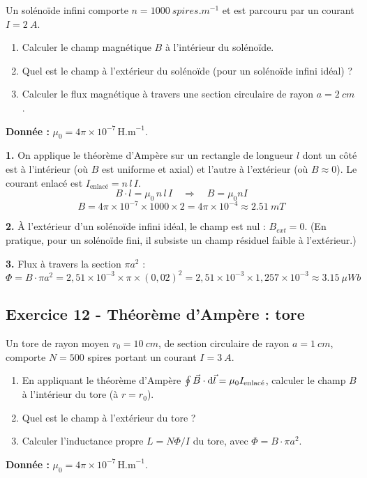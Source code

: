 \documentclass[12pt,a4paper]{article}
\begin{document}
\begin{boiteexercice}
Un solénoïde infini comporte $n = \qty{1000}{spires.m^{-1}}$ et est parcouru par un courant $I = \qty{2}{A}$.
\begin{enumerate}
  \item Calculer le champ magnétique $B$ à l'intérieur du solénoïde.
  \item Quel est le champ à l'extérieur du solénoïde (pour un solénoïde infini idéal) ?
  \item Calculer le flux magnétique à travers une section circulaire de rayon $a = \qty{2}{cm}$.
\end{enumerate}
\textbf{Donnée :} $\mu_0 = 4\pi\times10^{-7}\,\text{H.m}^{-1}$.
\end{boiteexercice}

\begin{boitecorrige}
\textbf{1.} On applique le théorème d'Ampère sur un rectangle de longueur $l$ dont un côté est à l'intérieur (où $B$ est uniforme et axial) et l'autre à l'extérieur (où $B\approx0$). Le courant enlacé est $I_{\text{enlacé}} = n\,l\,I$.
\[
B\cdot l = \mu_0\,n\,l\,I \quad \Rightarrow \quad \boxed{B = \mu_0 n I}
\]
\[
B = 4\pi\times10^{-7}\times1000\times2 = 4\pi\times10^{-4} \approx \qty{2.51}{mT}
\]

\textbf{2.} À l'extérieur d'un solénoïde infini idéal, le champ est nul : $B_{ext} = 0$. (En pratique, pour un solénoïde fini, il subsiste un champ résiduel faible à l'extérieur.)

\textbf{3.} Flux à travers la section $\pi a^2$ :
\[
\Phi = B\cdot\pi a^2 = 2{,}51\times10^{-3}\times\pi\times(0{,}02)^2 = 2{,}51\times10^{-3}\times1{,}257\times10^{-3} \approx \qty{3.15}{\mu Wb}
\]
\end{boitecorrige}

\subsection*{Exercice 12 - Théorème d'Ampère : tore \niveau{\difficile}}

\begin{boiteexercice}
Un tore de rayon moyen $r_0 = \qty{10}{cm}$, de section circulaire de rayon $a = \qty{1}{cm}$, comporte $N = 500$ spires portant un courant $I = \qty{3}{A}$.
\begin{enumerate}
  \item En appliquant le théorème d'Ampère $\oint \vec{B}\cdot\mathrm{d}\vec{l} = \mu_0 I_{\text{enlacé}}$, calculer le champ $B$ à l'intérieur du tore (à $r = r_0$).
  \item Quel est le champ à l'extérieur du tore ?
  \item Calculer l'inductance propre $L = N\Phi/I$ du tore, avec $\Phi = B\cdot\pi a^2$.
\end{enumerate}
\textbf{Donnée :} $\mu_0 = 4\pi\times10^{-7}\,\text{H.m}^{-1}$.
\end{boiteexercice}
\end{document}
